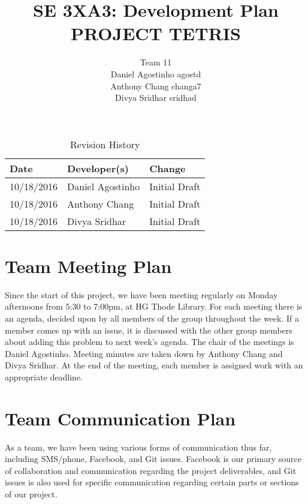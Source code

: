 \documentclass{article}
\title{SE 3XA3: Development Plan\\PROJECT TETRIS}
\author{Team 11
		\\ Daniel Agostinho agostd
		\\ Anthony Chang changa7
		\\ Divya Sridhar sridhad
}
\date{}
\begin{document}
\begin{table}[hp]
\caption{Revision History} \label{TblRevisionHistory}
\begin{tabularx}{\textwidth}{llX}
\toprule
\textbf{Date} & \textbf{Developer(s)} & \textbf{Change}\\
\midrule
10/18/2016 & Daniel Agostinho & Initial Draft\\
10/18/2016 & Anthony Chang & Initial Draft\\
10/18/2016 & Divya Sridhar & Initial Draft\\
\bottomrule
\end{tabularx}
\end{table}
\newpage
\maketitle
\section{Team Meeting Plan}
Since the start of this project, we have been meeting regularly on Monday afternoons from 5:30 to 7:00pm, at HG Thode Library. For each meeting there is an agenda, decided upon by all members of the group throughout the week. If a member comes up with an issue, it is discussed with the other group members about adding this problem to next week's agenda. The chair of the meetings is Daniel Agostinho. Meeting minutes are taken down by Anthony Chang and Divya Sridhar. At the end of the meeting, each member is assigned work with an appropriate deadline.
\section{Team Communication Plan}
As a team, we have been using various forms of communication thus far, including SMS/phone, Facebook, and Git issues. Facebook is our primary source of collaboration and communication regarding the project deliverables, and Git issues is also used for specific communication regarding certain parts or sections of our project.
\end{document}

